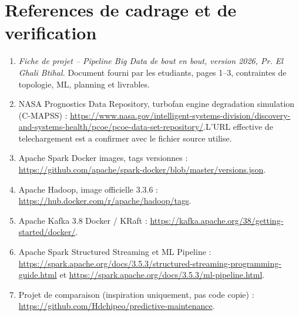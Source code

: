 \documentclass[10pt,a4paper]{article}
\newcommand{\docref}{\emph{Fiche de projet -- Pipeline Big Data de bout en bout, version 2026, Pr. El Ghali Btihal.}}
\begin{document}
\section*{References de cadrage et de verification}
\begin{enumerate}[leftmargin=20pt]
\item \docref{} Document fourni par les etudiants, pages 1--3, contraintes de topologie, ML, planning et livrables.
\item NASA Prognostics Data Repository, turbofan engine degradation simulation (C-MAPSS) : \url{https://www.nasa.gov/intelligent-systems-division/discovery-and-systems-health/pcoe/pcoe-data-set-repository/}.\newline L'URL effective de telechargement est a confirmer avec le fichier source utilise.
\item Apache Spark Docker images, tags versionnes : \url{https://github.com/apache/spark-docker/blob/master/versions.json}.
\item Apache Hadoop, image officielle 3.3.6 : \url{https://hub.docker.com/r/apache/hadoop/tags}.
\item Apache Kafka 3.8 Docker / KRaft : \url{https://kafka.apache.org/38/getting-started/docker/}.
\item Apache Spark Structured Streaming et ML Pipeline : \url{https://spark.apache.org/docs/3.5.3/structured-streaming-programming-guide.html} et \url{https://spark.apache.org/docs/3.5.3/ml-pipeline.html}.
\item Projet de comparaison (inspiration uniquement, pas code copie) : \url{https://github.com/Hdchipeo/predictive-maintenance}.
\end{enumerate}
\end{document}
